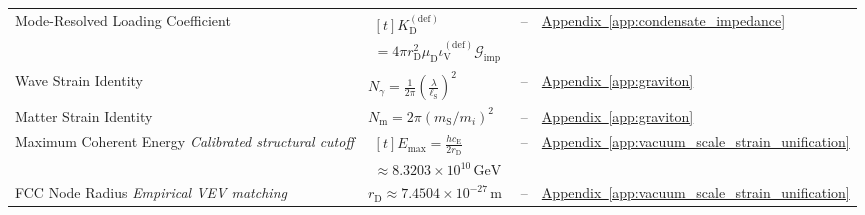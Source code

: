 \begin{longtable}{@{} p{4.5cm} p{6cm} c p{4cm} @{}}
{\raggedright Mode-Resolved Loading Coefficient\par} & {\raggedright $\begin{gathered}[t]K_{\mathrm D}^{(\mathrm{def})} \\ =4\pi r_{\mathrm D}^2\mu_{\mathrm D}\iota_{\mathrm V}^{(\mathrm{def})}\mathcal G_{\mathrm{imp}}\end{gathered}$\par} & -- & {\raggedright \hyperref[app:condensate_impedance]{Appendix~\ref*{app:condensate_impedance}}\par} \\

{\raggedright Wave Strain Identity\par} & {\raggedright $N_{\gamma} = \frac{1}{2\pi} \left(\frac{\lambda}{\ell_{\mathrm{S}}}\right)^2$\par} & -- & {\raggedright \hyperref[app:graviton]{Appendix~\ref*{app:graviton}}\par} \\

{\raggedright Matter Strain Identity\par} & {\raggedright $N_{\mathrm m}=2\pi(m_{\mathrm S}/m_i)^2$\par} & -- & {\raggedright \hyperref[app:graviton]{Appendix~\ref*{app:graviton}}\par} \\

{\raggedright Maximum Coherent Energy \newline \textit{Calibrated structural cutoff}\par} & {\raggedright $\begin{gathered}[t]E_{\max}=\frac{hc_{\mathrm E}}{2r_{\mathrm D}} \\ \approx8.3203\times10^{10}\,\mathrm{GeV}\end{gathered}$\par} & -- & {\raggedright \hyperref[app:vacuum_scale_strain_unification]{Appendix~\ref*{app:vacuum_scale_strain_unification}}\par} \\

{\raggedright FCC Node Radius \newline \textit{Empirical VEV matching}\par} & {\raggedright $r_{\mathrm D}\approx7.4504\times10^{-27}\,\mathrm m$\par} & -- & {\raggedright \hyperref[app:vacuum_scale_strain_unification]{Appendix~\ref*{app:vacuum_scale_strain_unification}}\par} \\


\end{longtable}
